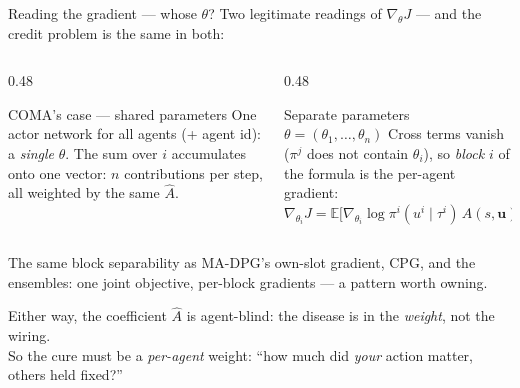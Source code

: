 \documentclass[10pt, aspectratio=169]{beamer}
\begin{document}
\begin{frame}{Reading the gradient --- whose $\theta$?}
Two legitimate readings of $\nabla_\theta J$ --- and the credit problem is the same in both:
\smallskip
\begin{columns}[T]
\begin{column}{0.48\linewidth}
\begin{block}{COMA's case --- shared parameters}
One actor network for all agents (+ agent id): a \emph{single} $\theta$. The sum over $i$ \alert{accumulates onto one vector}: $n$ contributions per step, all weighted by the same $\hat A$.
\end{block}
\end{column}
\hfill
\begin{column}{0.48\linewidth}
\begin{block}{Separate parameters $\theta = (\theta_1,\dots,\theta_n)$}
Cross terms vanish ($\pi^j$ does not contain $\theta_i$), so \emph{block $i$} of the formula is the per-agent gradient:
\centering $\nabla_{\theta_i} J = \mathbb{E}\big[ \nabla_{\theta_i}\log\pi^i(u^i\mid\tau^i)\, \hat A(s,\mathbf{u}) \big]$
\end{block}
\end{column}
\end{columns}
\medskip

\pause
{\footnotesize\textcolor{mLightBrown}{The same block separability as MA-DPG's own-slot gradient, CPG, and the ensembles: one joint objective, per-block gradients --- a pattern worth owning.}}
\smallskip

\pause
\begin{center}
\alert{Either way, the coefficient $\hat A$ is agent-blind: the disease is in the \emph{weight}, not the wiring.}\\[2pt]
So the cure must be a \emph{per-agent} weight: ``how much did \emph{your} action matter, others held fixed?''
\end{center}
\end{frame}
\end{document}
